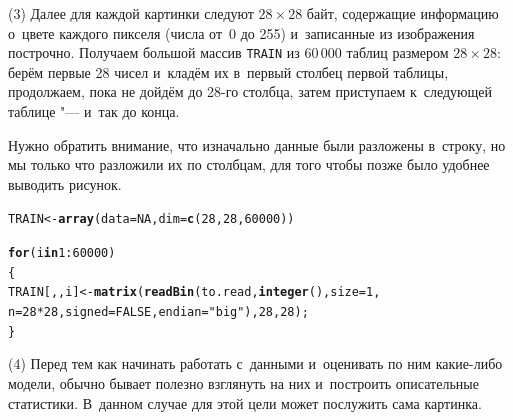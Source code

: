 \documentclass[final,pdftex]{../../template/epsilonj}\usepackage[]{graphicx}\usepackage[]{color}
\makeatletter
\newcommand{\hlnum}[1]{\textcolor[rgb]{0.686,0.059,0.569}{#1}}%
\newcommand{\hlstr}[1]{\textcolor[rgb]{0.192,0.494,0.8}{#1}}%
\newcommand{\hlopt}[1]{\textcolor[rgb]{0,0,0}{#1}}%
\newcommand{\hlstd}[1]{\textcolor[rgb]{0.345,0.345,0.345}{#1}}%
\newcommand{\hlkwa}[1]{\textcolor[rgb]{0.161,0.373,0.58}{\textbf{#1}}}%
\newcommand{\hlkwb}[1]{\textcolor[rgb]{0.69,0.353,0.396}{#1}}%
\newcommand{\hlkwc}[1]{\textcolor[rgb]{0.333,0.667,0.333}{#1}}%
\newcommand{\hlkwd}[1]{\textcolor[rgb]{0.737,0.353,0.396}{\textbf{#1}}}%
\newenvironment{kframe}{%
 \def\at@end@of@kframe{}%
 \ifinner\ifhmode%
  \def\at@end@of@kframe{\end{minipage}}%
  \begin{minipage}{\columnwidth}%
 \fi\fi%
 \def\FrameCommand##1{\hskip\@totalleftmargin \hskip-\fboxsep
 \colorbox{shadecolor}{##1}\hskip-\fboxsep
     \hskip-\linewidth \hskip-\@totalleftmargin \hskip\columnwidth}%
 \MakeFramed {\advance\hsize-\width
   \@totalleftmargin\z@ \linewidth\hsize
   \@setminipage}}%
 {\par\unskip\endMakeFramed%
 \at@end@of@kframe}
\newenvironment{knitrout}{}{} %
\makeatother
\begin{document}
\par\medskip (3) Далее для каждой картинки следуют $28\times28$ байт, содержащие информацию о~цвете каждого пикселя (числа от~0 до 255) и~записанные из изображения построчно. 
Получаем большой массив \texttt{TRAIN} из 60\,000 таблиц размером $28\times28$: берём первые 28 чисел и~кладём их в~первый столбец первой таблицы, продолжаем, пока не дойдём до 28-го столбца, затем приступаем к~следующей таблице "--- и~так до конца. 

Нужно обратить внимание, что изначально данные были разложены в~строку, но мы только что разложили их по столбцам, для того чтобы позже было удобнее выводить рисунок.

\begin{knitrout}
\color{fgcolor}\begin{kframe}
\begin{alltt}
\hlstd{TRAIN} \hlkwb{<-} \hlkwd{array}\hlstd{(}\hlkwc{data} \hlstd{=} \hlnum{NA}\hlstd{,} \hlkwc{dim} \hlstd{=} \hlkwd{c}\hlstd{(}\hlnum{28}\hlstd{,}\hlnum{28}\hlstd{,}\hlnum{60000}\hlstd{))}

\hlkwa{for}\hlstd{(i} \hlkwa{in} \hlnum{1}\hlopt{:}\hlnum{60000}\hlstd{)}
  \hlstd{\{}
\hlstd{TRAIN[,,i]} \hlkwb{<-} \hlkwd{matrix}\hlstd{(}\hlkwd{readBin}\hlstd{(to.read,}\hlkwd{integer}\hlstd{(),} \hlkwc{size} \hlstd{=} \hlnum{1}\hlstd{,}
    \hlkwc{n} \hlstd{=} \hlnum{28}\hlopt{*}\hlnum{28}\hlstd{,} \hlkwc{signed} \hlstd{=} \hlnum{FALSE}\hlstd{,} \hlkwc{endian} \hlstd{=} \hlstr{"big"}\hlstd{),} \hlnum{28}\hlstd{,} \hlnum{28}\hlstd{);}
  \hlstd{\}}
\end{alltt}
\end{kframe}
\end{knitrout}

\par\medskip (4) Перед тем как начинать работать с~данными и~оценивать по ним какие-либо модели, обычно бывает полезно взглянуть на них и~построить описательные статистики. В~данном случае для этой цели может послужить сама картинка.
\end{document}

